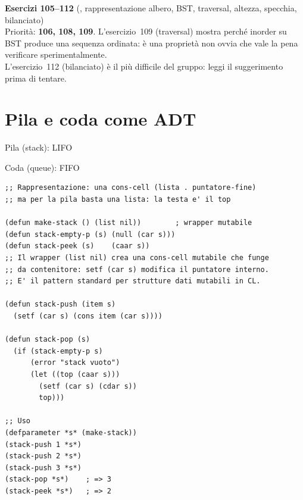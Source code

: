 \begin{workbook}
\textbf{Esercizi 105--112}
(, rappresentazione albero, BST, traversal,
altezza, specchia, bilanciato)\\[4pt]
Priorità: \textbf{106, 108, 109}.
L'esercizio~109 (traversal) mostra perché inorder su BST produce
una sequenza ordinata: è una proprietà non ovvia che vale la pena
verificare sperimentalmente.\\[4pt]
L'esercizio~112 (bilanciato) è il più difficile del gruppo:
leggi il suggerimento prima di tentare.
\end{workbook}

\section{Pila e coda come ADT}

\begin{concetto}{Pila (stack): LIFO}

\boxsep
{}
\end{concetto}

\begin{concetto}{Coda (queue): FIFO}

\boxsep
{}
\end{concetto}

\begin{esempio}
\begin{lstlisting}
;; Rappresentazione: una cons-cell (lista . puntatore-fine)
;; ma per la pila basta una lista: la testa e' il top

(defun make-stack () (list nil))        ; wrapper mutabile
(defun stack-empty-p (s) (null (car s)))
(defun stack-peek (s)    (caar s))
;; Il wrapper (list nil) crea una cons-cell mutabile che funge
;; da contenitore: setf (car s) modifica il puntatore interno.
;; E' il pattern standard per strutture dati mutabili in CL.

(defun stack-push (item s)
  (setf (car s) (cons item (car s))))

(defun stack-pop (s)
  (if (stack-empty-p s)
      (error "stack vuoto")
      (let ((top (caar s)))
        (setf (car s) (cdar s))
        top)))

;; Uso
(defparameter *s* (make-stack))
(stack-push 1 *s*)
(stack-push 2 *s*)
(stack-push 3 *s*)
(stack-pop *s*)    ; => 3
(stack-peek *s*)   ; => 2
\end{lstlisting}
\end{esempio}

